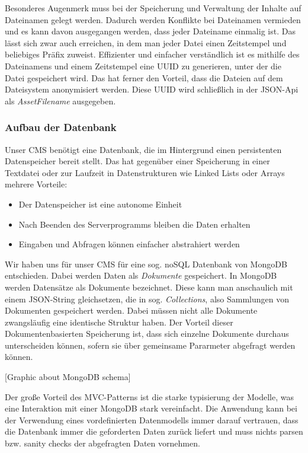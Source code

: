 \documentclass[titlepage, a4paper, 11pt]{scrartcl}
\begin{document}
        Besonderes Augenmerk muss bei der Speicherung und Verwaltung der Inhalte auf Dateinamen gelegt werden. Dadurch werden Konflikte bei Dateinamen vermieden und es kann
        davon ausgegangen werden, dass jeder Dateiname einmalig ist. Das lässt sich zwar auch erreichen, in dem man jeder Datei einen Zeitstempel und beliebiges Präfix zuweist.
        Effizienter und einfacher verständlich ist es mithilfe des Dateinamens und einem Zeitstempel eine UUID zu generieren, unter der die Datei gespeichert wird.
        Das hat ferner den Vorteil, dass die Dateien auf dem Dateisystem anonymisiert werden. Diese UUID wird schließlich in der JSON-Api als \textit{AssetFilename} ausgegeben.       

      \subsubsection{Aufbau der Datenbank}

        Unser CMS benötigt eine Datenbank, die im Hintergrund einen persistenten Datenspeicher bereit stellt.
        Das hat gegenüber einer Speicherung in einer Textdatei oder zur Laufzeit in Datenstrukturen wie Linked Lists oder Arrays mehrere Vorteile:

        \begin{itemize}
          \item Der Datenspeicher ist eine autonome Einheit
          \item Nach Beenden des Serverprogramms bleiben die Daten erhalten
          \item Eingaben und Abfragen können einfacher abstrahiert werden
        \end{itemize}

        Wir haben uns für unser CMS für eine sog. noSQL Datenbank von MongoDB entschieden. Dabei werden Daten als \textit{Dokumente} gespeichert. 
        In MongoDB werden Datensätze als Dokumente bezeichnet. Diese kann man anschaulich mit einem JSON-String gleichsetzen, die in sog. \textit{Collections},
        also Sammlungen von Dokumenten gespeichert werden. Dabei müssen nicht alle Dokumente zwangsläufig eine identische Struktur haben.
        Der Vorteil dieser Dokumentenbasierten Speicherung ist, dass sich einzelne Dokumente durchaus unterscheiden können, sofern sie über gemeinsame Pararmeter abgefragt werden können.

        [Graphic about MongoDB schema]

        Der große Vorteil des MVC-Patterns ist die starke typisierung der Modelle, was eine Interaktion mit einer MongoDB stark vereinfacht.
        Die Anwendung kann bei der Verwendung eines vordefinierten Datenmodells immer darauf vertrauen, dass die Datenbank immer die geforderten Daten zurück liefert 
        und muss nichts parsen bzw. sanity checks der abgefragten Daten vornehmen.
\end{document}

